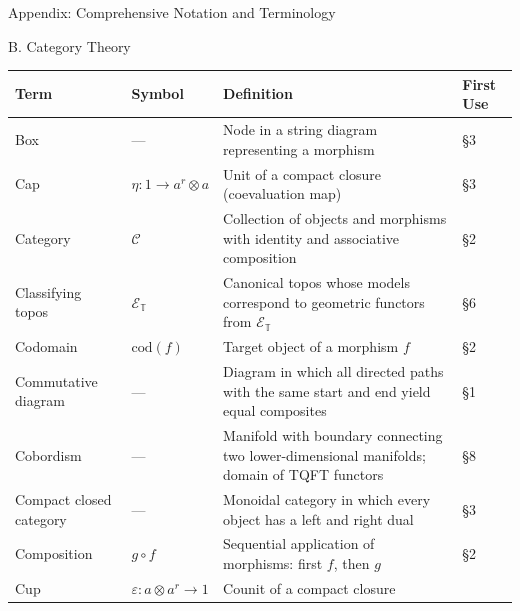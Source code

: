 \documentclass[
  ignorenonframetext,
]{beamer}
\newcounter{none} %
\begin{document}
\begin{frame}[fragile]{Appendix: Comprehensive Notation and Terminology}
\begin{block}{B. Category Theory}
\protect{}\label{b.-category-theory}
{\def\LTcaptype{none} %
\begin{longtable}[]{@{}
  >{\raggedright\arraybackslash}p{}
  >{\centering\arraybackslash}p{}
  >{\raggedright\arraybackslash}p{}
  >{\centering\arraybackslash}p{}@{}}
\toprule\noalign{}
\begin{minipage}[b]{\linewidth}\raggedright
Term
\end{minipage} & \begin{minipage}[b]{\linewidth}\centering
Symbol
\end{minipage} & \begin{minipage}[b]{\linewidth}\raggedright
Definition
\end{minipage} & \begin{minipage}[b]{\linewidth}\centering
First Use
\end{minipage} \\
\midrule\noalign{}
\endhead
Box & --- & Node in a string diagram representing a morphism & §3 \\
Cap & \(\eta: 1 \to a^r \otimes a\) & Unit of a compact closure
(coevaluation map) & §3 \\
Category & \(\mathcal{C}\) & Collection of objects and morphisms with
identity and associative composition & §2 \\
Classifying topos & \(\mathcal{E}_{\mathbb{T}}\) & Canonical topos whose
models correspond to geometric functors from
\(\mathcal{E}_{\mathbb{T}}\) & §6 \\
Codomain & \(\text{cod}(f)\) & Target object of a morphism \(f\) & §2 \\
Commutative diagram & --- & Diagram in which all directed paths with the
same start and end yield equal composites & §1 \\
Cobordism & --- & Manifold with boundary connecting two
lower-dimensional manifolds; domain of TQFT functors & §8 \\
Compact closed category & --- & Monoidal category in which every object
has a left and right dual & §3 \\
Composition & \(g \circ f\) & Sequential application of morphisms: first
\(f\), then \(g\) & §2 \\
Cup & \(\varepsilon: a \otimes a^r \to 1\) & Counit of a compact closure

\end{longtable}}
\end{block}
\end{frame}
\end{document}

